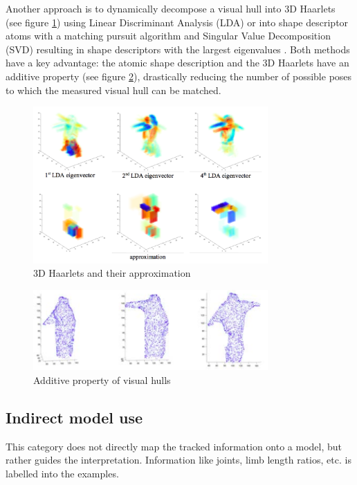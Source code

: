 Another approach is to dynamically decompose a visual hull into 3D Haarlets (see figure \ref{fig:haarlet}) using Linear Discriminant Analysis (LDA) \cite{VandenBergh} or into shape descriptor atoms with a matching pursuit algorithm and Singular Value Decomposition (SVD) resulting in shape descriptors with the largest eigenvalues \cite{Chu}. Both methods have a key advantage: the atomic shape description and the 3D Haarlets have an additive property (see figure \ref{fig:visualhull}), drastically reducing the number of possible poses to which the measured visual hull can be matched.
\begin{figure}[h!]
\center
\includegraphics[width=0.8\textwidth]{images/seminar/ldaeigenvectors.png}
\caption{3D Haarlets and their approximation\cite{VandenBergh}}
\label{fig:haarlet}
\end{figure}
\begin{figure}[h!]
\center
\includegraphics[width=0.8\textwidth]{images/seminar/visualhullcomposition.png}
\caption{Additive property of visual hulls \cite{Chu}}
\label{fig:visualhull}
\end{figure}

\subsection{Indirect model use}
\label{sub:indirect-model-use}

This category does not directly map the tracked information onto a model, but rather guides the interpretation. Information like joints, limb length ratios, etc. is labelled into the examples.

